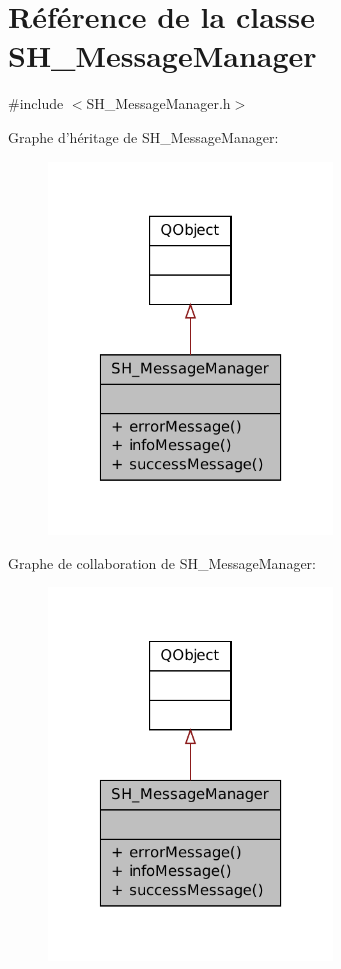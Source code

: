 \hypertarget{classSH__MessageManager}{\section{Référence de la classe S\-H\-\_\-\-Message\-Manager}
\label{classSH__MessageManager}
}


{\ttfamily \#include $<$S\-H\-\_\-\-Message\-Manager.\-h$>$}



Graphe d'héritage de S\-H\-\_\-\-Message\-Manager\-:\nopagebreak
\begin{figure}[H]
\begin{center}
\leavevmode
\includegraphics[width=214pt]{classSH__MessageManager__inherit__graph}
\end{center}
\end{figure}


Graphe de collaboration de S\-H\-\_\-\-Message\-Manager\-:\nopagebreak
\begin{figure}[H]
\begin{center}
\leavevmode
\includegraphics[width=214pt]{classSH__MessageManager__coll__graph}
\end{center}
\end{figure}
